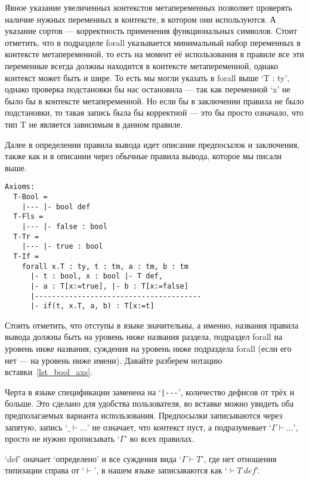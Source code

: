 Явное указание увеличенных контекстов метапеременных позволяет проверять наличие нужных переменных в контексте, в котором они используются. А указание сортов --- корректность применения функциональных символов. Стоит отметить, что в подразделе forall указывается минимальный набор переменных в контексте метапеременной, то есть на момент её использования в правиле все эти переменные всегда должны находится в контексте метапеременной, однако контекст может быть и шире. То есть мы могли указать в forall выше `T : ty', однако проверка подстановки бы нас остановила --- так как переменной `x' не было бы в контексте метапеременной. Но если бы в заключении правила не было подстановки, то такая запись была бы корректной --- это бы просто означало, что тип T не является зависимым в данном правиле.

\hfill

Далее в определении правила вывода идет описание предпосылок и заключения, также как и в описании через обычные правила вывода, которое мы писали выше.

\begin{lstlisting}[label={lst_bool_axs}, caption={Правила вывода языка Bool, описанные в языке спецификации},captionpos=b, frame=single, float]
Axioms:
  T-Bool =
    |--- |- bool def
  T-Fls =
    |--- |- false : bool
  T-Tr =
    |--- |- true : bool
  T-If =
    forall x.T : ty, t : tm, a : tm, b : tm
      |- t : bool, x : bool |- T def,
      |- a : T[x:=true], |- b : T[x:=false]
      |---------------------------------------
      |- if(t, x.T, a, b) : T[x:=t]
\end{lstlisting}

Стоить отметить, что отступы в языке значительны, а именно, названия правила вывода должны быть на уровень ниже названия раздела, подраздел forall на уровень ниже названия, суждения на уровень ниже подраздела forall (если его нет --- на уровень ниже имени). Давайте разберем нотацию вставки~\ref{lst_bool_axs}.

Черта в языке спецификации заменена на `\lstinline{|---}', количество дефисов от трёх и больше. Это сделано для удобства пользователя, во вставке можно увидеть оба предполагаемых варианта использования. Предпосылки записываются через запятую, запись `$\_ \vdash ... $' не означает, что контекст пуст, а подразумевает `$\Gamma \vdash ... $', просто не нужно прописывать `$\Gamma$' во всех правилах.

`def' оначает `определено' и все суждения вида `$\Gamma \vdash T$', где нет отношения типизации справа от `$\vdash$', в нашем языке записываются как `$ \vdash T\ def$'.

